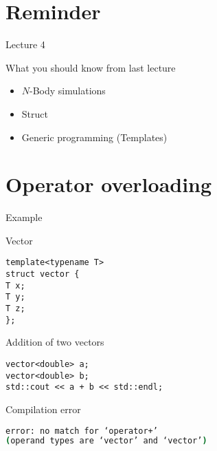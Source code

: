 \documentclass[12pt,t]{beamer}
\title{\coursename}
\subtitle{Lecture 5: Operator overloading and structuring programs}
\date {
 \tiny \url{\courseurl}
\vspace{2cm}
\doclicenseThis  
  
}
\begin{document}
 {
    \frame {
        \titlepage
    }
}

\frame{

\tableofcontents

}


\section{Reminder}
\begin{frame}{Lecture 4}
\begin{block}{What you should know from last lecture}
\begin{itemize}
\item $N$-Body simulations
\item Struct
\item Generic programming (Templates)
\end{itemize}
\end{block}
\end{frame}

\section{Operator overloading}

\begin{frame}[fragile]{Example}

\begin{block}{Vector}
\begin{lstlisting}
template<typename T>
struct vector {
T x;
T y;
T z;
};
\end{lstlisting}
\end{block}

\begin{block}{Addition of two vectors}
\begin{lstlisting}
vector<double> a;
vector<double> b;
std::cout << a + b << std::endl;
\end{lstlisting}
\end{block}
\pause
\begin{block}{Compilation error}
\begin{lstlisting}[language=bash]
error: no match for ‘operator+’ 
(operand types are ‘vector’ and ‘vector’)
\end{lstlisting}
\end{block}
\end{frame}
\end{document}
